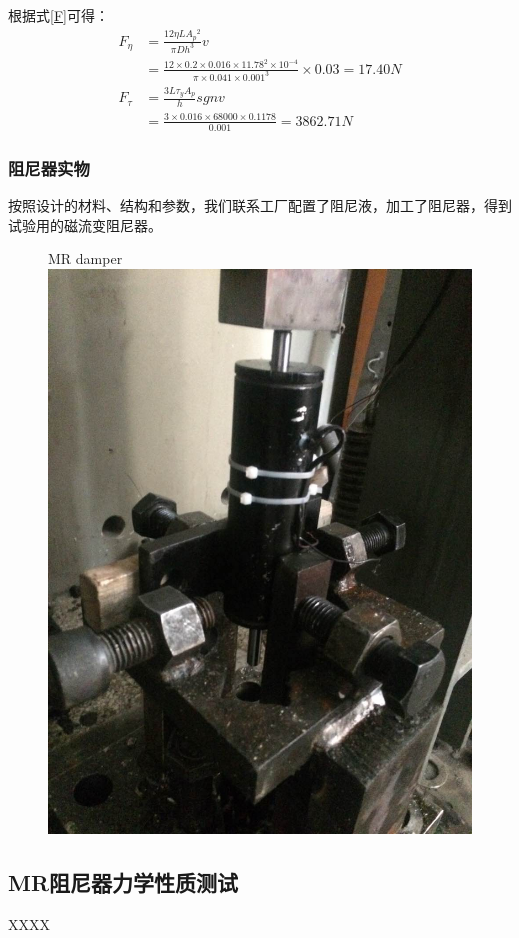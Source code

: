 根据式\eqref{F}可得：
\begin{equation}
\begin{split}
F_\eta&=\frac{12\eta LA{_p}{^2}}{\pi Dh^3}v\\&=\frac{12\times0.2\times0.016\times11.78^2\times10^{-4}}{\pi\times0.041\times0.001^3}\times0.03=17.40N
\\
F_{\tau}&=\frac{3L\tau_yA_p}{h}sgnv\\&=\frac{3\times0.016\times68000\times0.1178}{0.001}=3862.71N
\end{split}
\end{equation}

\subsubsection{阻尼器实物}
按照设计的材料、结构和参数，我们联系工厂配置了阻尼液，加工了阻尼器，得到试验用的磁流变阻尼器。

\begin{figure}[H]
	\centering
		{MR damper}
	\label{shiwu}
	\includegraphics[width=.5\linewidth]{figure/shiwu}
\end{figure}

\subsection{MR阻尼器力学性质测试}

XXXX


